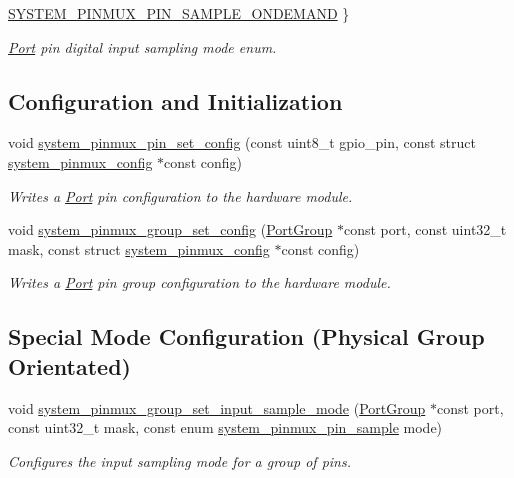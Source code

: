 \begin{DoxyCompactItemize}
\mbox{\hyperlink{group__asfdoc__sam0__system__pinmux__group_ggac0c5f124b2d0deed3751156f20135994ad695b5c51ca3cb2a7c35bb32209325a2}{S\+Y\+S\+T\+E\+M\+\_\+\+P\+I\+N\+M\+U\+X\+\_\+\+P\+I\+N\+\_\+\+S\+A\+M\+P\+L\+E\+\_\+\+O\+N\+D\+E\+M\+A\+ND}}
 \}
\begin{DoxyCompactList}\small\item\em \mbox{\hyperlink{struct_port}{Port}} pin digital input sampling mode enum. \end{DoxyCompactList}\end{DoxyCompactItemize}
\subsection*{Configuration and Initialization}
\begin{DoxyCompactItemize}
\item 
void \mbox{\hyperlink{group__asfdoc__sam0__system__pinmux__group_ga4aff9a23bc1233d74847bcdee4494439}{system\+\_\+pinmux\+\_\+pin\+\_\+set\+\_\+config}} (const uint8\+\_\+t gpio\+\_\+pin, const struct \mbox{\hyperlink{structsystem__pinmux__config}{system\+\_\+pinmux\+\_\+config}} $\ast$const config)
\begin{DoxyCompactList}\small\item\em Writes a \mbox{\hyperlink{struct_port}{Port}} pin configuration to the hardware module. \end{DoxyCompactList}\item 
void \mbox{\hyperlink{group__asfdoc__sam0__system__pinmux__group_ga7f19e634e8c05c0a84cebaf36054d78e}{system\+\_\+pinmux\+\_\+group\+\_\+set\+\_\+config}} (\mbox{\hyperlink{struct_port_group}{Port\+Group}} $\ast$const port, const uint32\+\_\+t mask, const struct \mbox{\hyperlink{structsystem__pinmux__config}{system\+\_\+pinmux\+\_\+config}} $\ast$const config)
\begin{DoxyCompactList}\small\item\em Writes a \mbox{\hyperlink{struct_port}{Port}} pin group configuration to the hardware module. \end{DoxyCompactList}\end{DoxyCompactItemize}
\subsection*{Special Mode Configuration (Physical Group Orientated)}
\begin{DoxyCompactItemize}
\item 
void \mbox{\hyperlink{group__asfdoc__sam0__system__pinmux__group_gaf01f6297e4699bf54b3df70d29f72593}{system\+\_\+pinmux\+\_\+group\+\_\+set\+\_\+input\+\_\+sample\+\_\+mode}} (\mbox{\hyperlink{struct_port_group}{Port\+Group}} $\ast$const port, const uint32\+\_\+t mask, const enum \mbox{\hyperlink{group__asfdoc__sam0__system__pinmux__group_gac0c5f124b2d0deed3751156f20135994}{system\+\_\+pinmux\+\_\+pin\+\_\+sample}} mode)
\begin{DoxyCompactList}\small\item\em Configures the input sampling mode for a group of pins. \end{DoxyCompactList}\end{DoxyCompactItemize}


